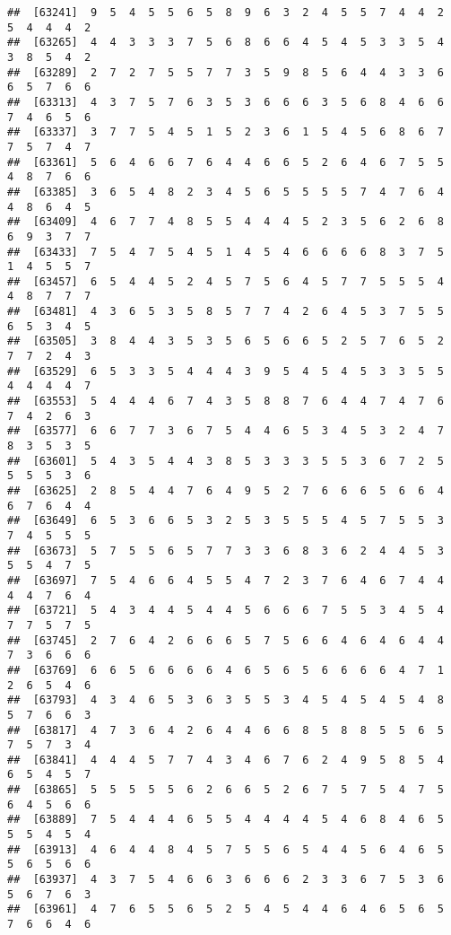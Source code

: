 \documentclass[
]{book}
\begin{document}
\begin{verbatim}
##  [63241]  9  5  4  5  5  6  5  8  9  6  3  2  4  5  5  7  4  4  2  5  4  4  4  2
##  [63265]  4  4  3  3  3  7  5  6  8  6  6  4  5  4  5  3  3  5  4  3  8  5  4  2
##  [63289]  2  7  2  7  5  5  7  7  3  5  9  8  5  6  4  4  3  3  6  6  5  7  6  6
##  [63313]  4  3  7  5  7  6  3  5  3  6  6  6  3  5  6  8  4  6  6  7  4  6  5  6
##  [63337]  3  7  7  5  4  5  1  5  2  3  6  1  5  4  5  6  8  6  7  7  5  7  4  7
##  [63361]  5  6  4  6  6  7  6  4  4  6  6  5  2  6  4  6  7  5  5  4  8  7  6  6
##  [63385]  3  6  5  4  8  2  3  4  5  6  5  5  5  5  7  4  7  6  4  4  8  6  4  5
##  [63409]  4  6  7  7  4  8  5  5  4  4  4  5  2  3  5  6  2  6  8  6  9  3  7  7
##  [63433]  7  5  4  7  5  4  5  1  4  5  4  6  6  6  6  8  3  7  5  1  4  5  5  7
##  [63457]  6  5  4  4  5  2  4  5  7  5  6  4  5  7  7  5  5  5  4  4  8  7  7  7
##  [63481]  4  3  6  5  3  5  8  5  7  7  4  2  6  4  5  3  7  5  5  6  5  3  4  5
##  [63505]  3  8  4  4  3  5  3  5  6  5  6  6  5  2  5  7  6  5  2  7  7  2  4  3
##  [63529]  6  5  3  3  5  4  4  4  3  9  5  4  5  4  5  3  3  5  5  4  4  4  4  7
##  [63553]  5  4  4  4  6  7  4  3  5  8  8  7  6  4  4  7  4  7  6  7  4  2  6  3
##  [63577]  6  6  7  7  3  6  7  5  4  4  6  5  3  4  5  3  2  4  7  8  3  5  3  5
##  [63601]  5  4  3  5  4  4  3  8  5  3  3  3  5  5  3  6  7  2  5  5  5  5  3  6
##  [63625]  2  8  5  4  4  7  6  4  9  5  2  7  6  6  6  5  6  6  4  6  7  6  4  4
##  [63649]  6  5  3  6  6  5  3  2  5  3  5  5  5  4  5  7  5  5  3  7  4  5  5  5
##  [63673]  5  7  5  5  6  5  7  7  3  3  6  8  3  6  2  4  4  5  3  5  5  4  7  5
##  [63697]  7  5  4  6  6  4  5  5  4  7  2  3  7  6  4  6  7  4  4  4  4  7  6  4
##  [63721]  5  4  3  4  4  5  4  4  5  6  6  6  7  5  5  3  4  5  4  7  7  5  7  5
##  [63745]  2  7  6  4  2  6  6  6  5  7  5  6  6  4  6  4  6  4  4  7  3  6  6  6
##  [63769]  6  6  5  6  6  6  6  4  6  5  6  5  6  6  6  6  4  7  1  2  6  5  4  6
##  [63793]  4  3  4  6  5  3  6  3  5  5  3  4  5  4  5  4  5  4  8  5  7  6  6  3
##  [63817]  4  7  3  6  4  2  6  4  4  6  6  8  5  8  8  5  5  6  5  7  5  7  3  4
##  [63841]  4  4  4  5  7  7  4  3  4  6  7  6  2  4  9  5  8  5  4  6  5  4  5  7
##  [63865]  5  5  5  5  5  6  2  6  6  5  2  6  7  5  7  5  4  7  5  6  4  5  6  6
##  [63889]  7  5  4  4  4  6  5  5  4  4  4  4  5  4  6  8  4  6  5  5  5  4  5  4
##  [63913]  4  6  4  4  8  4  5  7  5  5  6  5  4  4  5  6  4  6  5  5  6  5  6  6
##  [63937]  4  3  7  5  4  6  6  3  6  6  6  2  3  3  6  7  5  3  6  5  6  7  6  3
##  [63961]  4  7  6  5  5  6  5  2  5  4  5  4  4  6  4  6  5  6  5  7  6  6  4  6

\end{verbatim}
\end{document}
